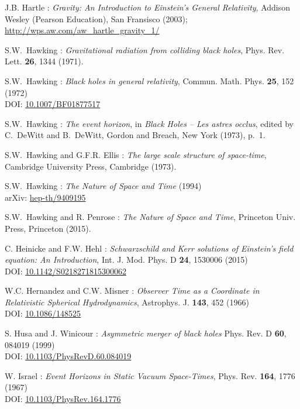 \begin{thebibliography}{123}
J.B. Hartle : \emph{Gravity: An Introduction to Einstein's General Relativity},
Addison Wesley (Pearson Education), San Fransisco (2003); \\
\url{http://wps.aw.com/aw_hartle_gravity_1/}

S.W.~Hawking : {\em Gravitational radiation from colliding black holes},
Phys. Rev. Lett. {\bf 26}, 1344 (1971).

S.W.~Hawking : {\em Black holes in general relativity},
Commun. Math. Phys. {\bf 25}, 152 (1972)\\
DOI: \href{http://dx.doi.org/10.1007/BF01877517}{10.1007/BF01877517}

S.W.~Hawking : {\em The event horizon},
in {\em Black Holes -- Les astres occlus}, edited by C.~DeWitt and B.~DeWitt,
Gordon and Breach, New York (1973), p.~1.

S.W.~Hawking and G.F.R. Ellis : {\em The large scale structure of
space-time},
Cambridge University Press, Cambridge (1973).

S.W.~Hawking : {\em The Nature of Space and Time} (1994)\\
arXiv: \href{https://arxiv.org/abs/hep-th/9409195}{hep-th/9409195}

S.W.~Hawking and R. Penrose : {\em The Nature of Space and Time},
Princeton Univ. Press, Princeton (2015).

C. Heinicke and F.W. Hehl :
{\em Schwarzschild and Kerr solutions of Einstein's field equation: An Introduction},
Int. J. Mod. Phys. D {\bf 24}, 1530006 (2015)\\
DOI: \href{http://dx.doi.org/10.1142/S0218271815300062}{10.1142/S0218271815300062}

W.C. Hernandez and C.W. Misner :
{\em Observer Time as a Coordinate in Relativistic Spherical Hydrodynamics},
Astrophys. J. {\bf 143}, 452 (1966) \\
DOI: \href{http://dx.doi.org/10.1086/148525}{10.1086/148525}

S. Husa and J. Winicour :
{\em Asymmetric merger of black holes}
Phys. Rev. D {\bf 60}, 084019 (1999)\\
DOI: \href{http://dx.doi.org/10.1103/PhysRevD.60.084019}{10.1103/PhysRevD.60.084019}

W. Israel : {\em Event Horizons in Static Vacuum Space-Times},
Phys. Rev. {\bf 164}, 1776 (1967)\\
DOI: \href{http://dx.doi.org/10.1103/PhysRev.164.1776}{10.1103/PhysRev.164.1776}


\end{thebibliography}
